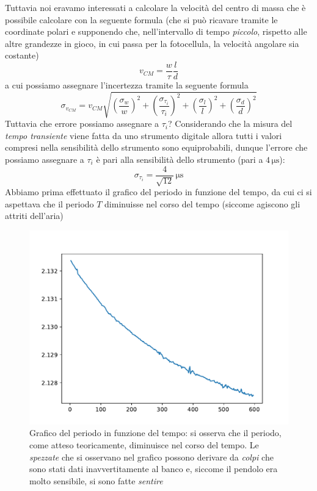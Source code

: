 \documentclass{article}
\begin{document}
\noindent Tuttavia noi eravamo interessati a calcolare la velocità del centro di massa che è possibile calcolare con la seguente formula (che si può ricavare tramite le coordinate polari e supponendo che, nell'intervallo di tempo \emph{piccolo}, rispetto alle altre grandezze in gioco, in cui passa per la fotocellula, la velocità angolare sia costante)
\begin{equation}
	v_{CM} = \frac{w}{\tau}\frac{l}{d}
\end{equation}
a cui possiamo assegnare l'incertezza tramite la seguente formula
\begin{equation}
	\sigma_{v_{CM}} = v_{CM} \sqrt{ \left( \frac{\sigma_w}{w} \right)^2 + \left( \frac{\sigma_{\tau_i}}{\tau_i} \right)^2 + \left( \frac{\sigma_l}{l} \right)^2 + \left( \frac{\sigma_d}{d} \right)^2}
\end{equation}
Tuttavia che errore possiamo assegnare a $\tau_i$? Considerando che la misura del \emph{tempo transiente} viene fatta da uno strumento digitale allora tutti i valori compresi nella sensibilità dello strumento sono equiprobabili, dunque l'errore che possiamo assegnare a $\tau_i$ è pari alla sensibilità dello strumento (pari a $4 \, \si{\micro\second}$):
$$
	\sigma_{\tau_i} = \frac{4}{\sqrt{12}} \, \si{\micro\second}
$$
Abbiamo prima effettuato il grafico del periodo in funzione del tempo, da cui ci si aspettava che il periodo $T$ diminuisse nel corso del tempo (siccome agiscono gli attriti dell'aria)
\begin{figure}[H]
	\centering
	\includegraphics[scale=0.60]{Grafico_periodo_tempo.pdf}
	\caption{Grafico del periodo in funzione del tempo: si osserva che il periodo, come atteso teoricamente, diminuisce nel corso del tempo. Le \emph{spezzate} che si osservano nel grafico possono derivare da \emph{colpi} che sono stati dati inavvertitamente al banco e, siccome il pendolo era molto sensibile, si sono fatte \emph{sentire} }
\end{figure}
\end{document}
